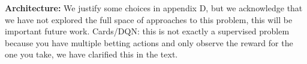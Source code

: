 \documentclass{article}
\begin{document}
\vspace{-0.1em}
\textbf{Architecture:} We justify some choices in appendix D, but we acknowledge that we have not explored the full space of approaches to this problem, this will be important future work. Cards/DQN: this is not exactly a supervised problem because you have multiple betting actions and only observe the reward for the one you take, we have clarified this in the text. \par 
\end{document}
